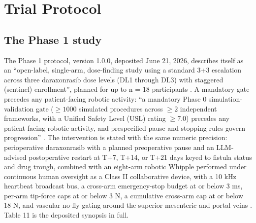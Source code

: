 \section{Trial Protocol}
\label{sec:protocol}

\subsection{The Phase 1 study}

The Phase 1 protocol, version 1.0.0, deposited June 21, 2026, describes itself
as an ``open-label, single-arm, dose-finding study using a standard 3+3
escalation across three daraxonrasib dose levels (DL1 through DL3) with
staggered (sentinel) enrollment'', planned for up to n = 18 participants
\cite{onpremwhippl}. A mandatory gate precedes any patient-facing robotic
activity: ``a mandatory Phase 0 simulation-validation gate ($\geq 1000$
simulated procedures across $\geq 2$ independent frameworks, with a Unified
Safety Level (USL) rating $\geq 7.0$) precedes any patient-facing robotic
activity, and prespecified pause and stopping rules govern progression''
\cite{onpremwhippl}. The intervention is stated with the same numeric
precision: perioperative daraxonrasib with a planned preoperative pause and an
LLM-advised postoperative restart at T+7, T+14, or T+21 days keyed to fistula
status and drug trough, combined with an eight-arm robotic Whipple performed
under continuous human oversight as a Class II collaborative device, with a 10
kHz heartbeat broadcast bus, a cross-arm emergency-stop budget at or below 3 ms,
per-arm tip-force caps at or below 3 N, a cumulative cross-arm cap at or below
18 N, and vascular no-fly gating around the superior mesenteric and portal veins
\cite{onpremwhippl}. Table 11 is the deposited synopsis in full.

